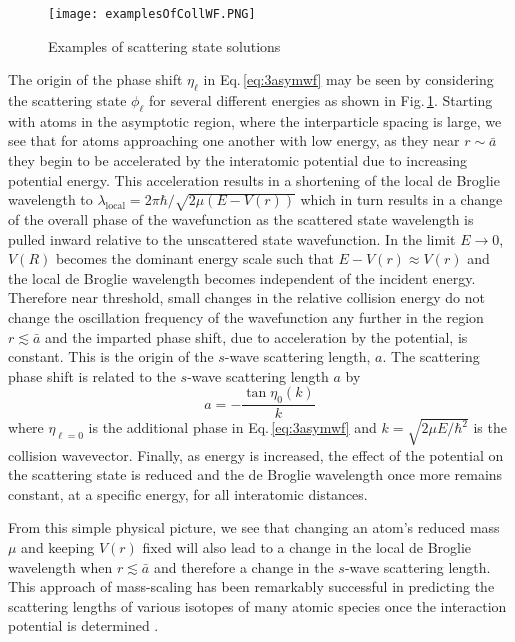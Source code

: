 \begin{figure} \label{fig:3collwf}
	\centerline{
	\texttt{[image: examplesOfCollWF.PNG]}}
	\caption{Examples of scattering state solutions}{}
\end{figure} 
The origin of the phase shift $\eta_{\ell}$ in Eq.\,\ref{eq:3asymwf} may be seen by considering the scattering state $\phi_{\ell}$ for several different energies as shown in Fig.\,\ref{fig:3collwf}.
Starting with atoms in the asymptotic region, where the interparticle spacing is large, we see that for atoms approaching one another with low energy, as they near $r\sim\bar{a}$ they begin to be accelerated by the interatomic potential due to increasing potential energy.
This acceleration results in a shortening of the local de Broglie wavelength to $\lambda_{\text{local}} = 2\pi\hbar/\sqrt{2\mu(E-V(r))}$ which in turn results in a change of the overall phase of the wavefunction as the scattered state wavelength is pulled inward relative to the unscattered state wavefunction.
In the limit $E\rightarrow0$, $V(R)$ becomes the dominant energy scale such that $E - V(r) \approx V(r)$ and the local de Broglie wavelength becomes independent of the incident energy.
Therefore near threshold, small changes in the relative collision energy do not change the oscillation frequency of the wavefunction any further in the region $r\lesssim\bar{a}$ and the imparted phase shift, due to acceleration by the potential, is constant.
This is the origin of the $s$-wave scattering length, $a$.
The scattering phase shift is related to the $s$-wave scattering length $a$ by
\begin{equation}
	a = -\frac{\tan \eta_0(k)}{k}
\end{equation}
where $\eta_{\ell=0}$ is the additional phase in Eq.\,\ref{eq:3asymwf} and $k=\sqrt{2 \mu E/\hbar^2}$ is the collision wavevector.
Finally, as energy is increased, the effect of the potential on the scattering state is reduced and the de Broglie wavelength once more remains constant, at a specific energy, for all interatomic distances.

From this simple physical picture, we see that changing an atom's reduced mass $\mu$ and keeping $V(r)$ fixed will also lead to a change in the local de Broglie wavelength when $r \lesssim \bar{a}$ and therefore a change in the $s$-wave scattering length.
This approach of mass-scaling has been remarkably successful in predicting the scattering lengths of various isotopes of many atomic species once the interaction potential is determined \cite{Julienne2009a}.

